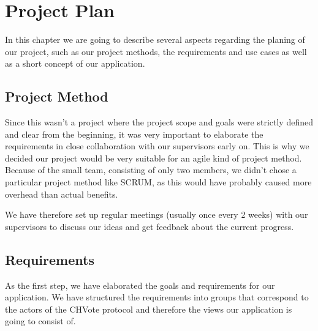 
\newcommand{\zs}[0]{\cellcolor{zscol}}				%
\newcommand{\zi}[0]{\cellcolor{zicol}}				%
\newcommand{\ms}[1]{
	\makebox[.7cm][r]{
		\tikz[baseline=(char.base)]{
			\node[shape=circle,draw,inner sep=.02cm,fill=black,text=white] (char) { #1 };
		}
	}
}

\newcommand{\sq}[1]{\textcolor{#1}{\rule{.3cm}{.3cm}}}

\newcommand{\phase}[1]{
	\multicolumn{22}{l}{} \\
	\multicolumn{22}{l}{\cellcolor{gray!20}\textbf{#1}} \\ \hline
}

\chapter{Project Plan}
In this chapter we are going to describe several aspects regarding the planing of our project, such as our project methods, the requirements and use cases as well as a short concept of our application. 
\section{Project Method}
Since this wasn't a project where the project scope and goals were strictly defined and clear from the beginning, it was very important to elaborate the requirements in close collaboration with our supervisors early on. This is why we decided our project would be very suitable for an agile kind of project method. Because of the small team, consisting of only two members, we didn't chose a particular project method like SCRUM, as this would have probably caused more overhead than actual benefits.  

We have therefore set up regular meetings (usually once every 2 weeks) with our supervisors to discuss our ideas and get feedback about the current progress.

\section{Requirements}
As the first step, we have elaborated the goals and requirements for our application. We have structured the requirements into groups that correspond to the actors of the CHVote protocol and therefore the views our application is going to consist of.

